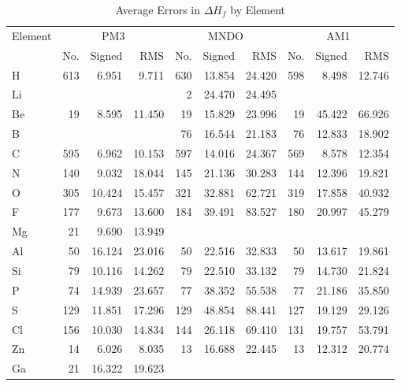 \begin{table}
\caption{\label{elehof} Average Errors in $\Delta H_f$ by Element} 
\compresstable
\begin{center}
\begin{tabular}{lrrrrrrrrr}
Element & \multicolumn{3}{c}{PM3} & \multicolumn{3}{c}{MNDO} & \multicolumn{3}{c}{AM1} \\
    & No. & Signed &    RMS    & No. & Signed &    RMS    & No. & Signed &    RMS   \\ \hline
  H & 613 &    6.951 &    9.711 & 630 &   13.854 &   24.420 & 598 &    8.498 &   12.746 \\
 Li &     &          &          &   2 &   24.470 &   24.495 &     &          &          \\
 Be &  19 &    8.595 &   11.450 &  19 &   15.829 &   23.996 &  19 &   45.422 &   66.926 \\
  B &     &          &          &  76 &   16.544 &   21.183 &  76 &   12.833 &   18.902 \\
  C & 595 &    6.962 &   10.153 & 597 &   14.016 &   24.367 & 569 &    8.578 &   12.354 \\
  N & 140 &    9.032 &   18.044 & 145 &   21.136 &   30.283 & 144 &   12.396 &   19.821 \\
  O & 305 &   10.424 &   15.457 & 321 &   32.881 &   62.721 & 319 &   17.858 &   40.932 \\
  F & 177 &    9.673 &   13.600 & 184 &   39.491 &   83.527 & 180 &   20.997 &   45.279 \\
 Mg &  21 &    9.690 &   13.949 &     &          &          &     &          &          \\
 Al &  50 &   16.124 &   23.016 &  50 &   22.516 &   32.833 &  50 &   13.617 &   19.861 \\
 Si &  79 &   10.116 &   14.262 &  79 &   22.510 &   33.132 &  79 &   14.730 &   21.824 \\
  P &  74 &   14.939 &   23.657 &  77 &   38.352 &   55.538 &  77 &   21.186 &   35.850 \\
  S & 129 &   11.851 &   17.296 & 129 &   48.854 &   88.441 & 127 &   19.129 &   29.126 \\
 Cl & 156 &   10.030 &   14.834 & 144 &   26.118 &   69.410 & 131 &   19.757 &   53.791 \\
 Zn &  14 &    6.026 &    8.035 &  13 &   16.688 &   22.445 &  13 &   12.312 &   20.774 \\
 Ga &  21 &   16.322 &   19.623 &     &          &          &     &          &          \\

\end{tabular}
\end{center}
\end{table}
